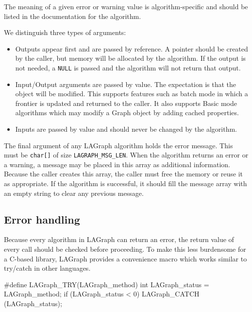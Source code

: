 The meaning of a given error or warning value is algorithm-specific
and should be listed in the documentation for the algorithm.

We distinguish three types of arguments:

\begin{itemize}
    \item 
    Outputs appear first and are passed by reference. A pointer should be created by the caller, but
    memory will be allocated by the algorithm. If the output is not needed, a \verb'NULL' is passed and the
    algorithm will not return that output.

    \item Input/Output arguments are passed by value. The expectation is that the object will be modified.
    This supports features such as batch mode in which a frontier is updated and returned to the caller.
    It also supports Basic mode algorithms which may modify a Graph object by adding cached properties.

    \item Inputs are passed by value and should never be changed by the algorithm.
\end{itemize}

The final argument of any LAGraph algorithm holds the error message. This must be \verb'char[]' of
size \verb'LAGRAPH_MSG_LEN'. When the algorithm returns an error or a warning, a message may be placed in
this array as additional information. Because the caller creates this array, the caller must free
the memory or reuse it as appropriate. If the algorithm is successful, it should fill the message array
with an empty string to clear any previous message.


\subsection{Error handling}

Because every algorithm in LAGraph can return an error, the return value of every call should be
checked before proceeding. To make this less burdensome for a C-based library, LAGraph provides a
convenience macro which works similar to try/catch in other languages.

\begin{cplus}
#define LAGraph_TRY(LAGraph_method)
{
    int LAGraph_status = LAGraph_method;
    if (LAGraph_status < 0)
    {
        LAGraph_CATCH (LAGraph_status);
    }
}
\end{cplus}


